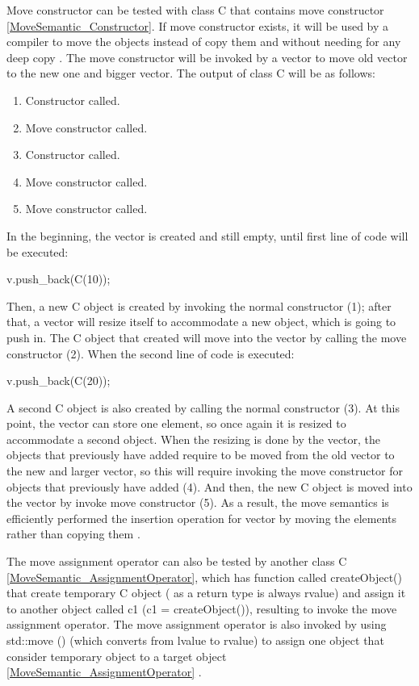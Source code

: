 \documentclass[11pt]{report}
\begin{document}
Move constructor can be tested with class C that contains move constructor \ref{MoveSemantic_Constructor}. If move constructor exists, it will be used by a compiler to move the objects instead of copy them and without needing for any deep copy \cite{MSDN:2012:CppModern}. The move constructor will be invoked by a vector to move old vector to the new one and bigger vector. The output of class C will be as follows:

\begin{enumerate}
\item Constructor called.
\item Move constructor called.
\item Constructor called.
\item Move constructor called.
\item Move constructor called.
\end{enumerate}

In the beginning, the vector is created and still empty, until first line of code will be executed:
\begin{center}
v.push\_back(C(10));
\end{center} 

Then, a new C object is created by invoking the normal constructor (1); after that, a vector will resize itself to accommodate a new object, which is going to push in. The C object that created will move into the vector by calling the move constructor (2). When the second line of code is executed:
\begin{center}
v.push\_back(C(20));
\end{center}

A second C object is also created by calling the normal constructor (3). At this point, the vector can store one element, so once again it is resized to accommodate a second object. When the resizing is done by the vector, the objects that previously have added require to be moved from the old vector to the new and larger vector, so this will require invoking the move constructor for objects that previously have added (4). And then, the new C object is moved into the vector by invoke move constructor (5). As a result, the move semantics is efficiently performed the insertion operation for vector by moving the elements rather than copying them \cite{MSDN:2012:CppModern}.


The move assignment operator can also be tested by another class C \ref{MoveSemantic_AssignmentOperator}, which has function called createObject() that create temporary C object ( as a return type is always rvalue) and assign it to another object called c1  (c1 = createObject()), resulting to invoke the move assignment operator. The move assignment operator is also invoked by using std::move () (which converts from lvalue to rvalue) to assign one object that consider temporary object to a target object \ref{MoveSemantic_AssignmentOperator} \cite{MSDN:2012:CppModern}.
\end{document}
